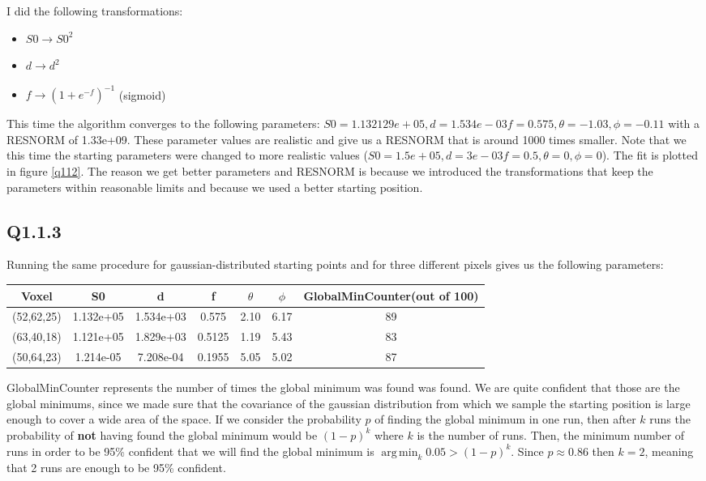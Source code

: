 \documentclass[11pt,a4paper,oneside]{report}
\DeclareMathOperator*{\argmin}{arg\,min}
\begin{document}
I did the following transformations:
\begin{itemize}
 \item $S0 \to S0^2$
 \item $d \to d^2$
 \item $f \to (1+e^{-f})^{-1}$ (sigmoid)
\end{itemize}
This time the algorithm converges to the following parameters: $S0 = 1.132129e+05, d=1.534e-03 f=0.575, \theta=-1.03,  \phi=-0.11$ with a RESNORM of 1.33e+09. These parameter values are realistic and give us a RESNORM that is around 1000 times smaller. Note that we this time the starting parameters were changed to more realistic values ($S0 = 1.5e+05, d=3e-03 f=0.5, \theta=0,  \phi=0$). The fit is plotted in figure \ref{q112}. The reason we get better parameters and RESNORM is because we introduced the transformations that keep the parameters within reasonable limits and because we used a better starting position.

\subsection*{Q1.1.3}
Running the same procedure for gaussian-distributed starting points and for three different pixels gives us the following parameters:
\begin{center}
\begin{tabular}{c | c | c | c | c | c | c}
Voxel & S0 & d & f & $\theta$ & $\phi$ & GlobalMinCounter(out of 100)\\
\hline
(52,62,25) & 1.132e+05 & 1.534e+03 & 0.575 & 2.10 & 6.17 & 89\\
(63,40,18) & 1.121e+05 & 1.829e+03 & 0.5125 & 1.19 & 5.43 & 83\\
(50,64,23) & 1.214e-05 & 7.208e-04 & 0.1955 & 5.05 & 5.02 & 87\\
\end{tabular}
\end{center}

GlobalMinCounter represents the number of times the global minimum was found was found. We are quite confident that those are the global minimums, since we made sure that the covariance of the gaussian distribution from which we sample the starting position is large enough to cover a wide area of the space. If we consider the probability $p$ of finding the global minimum in one run, then after $k$ runs the probability of \textbf{not} having found the global minimum would be $(1-p)^k$ where $k$ is the number of runs. Then, the minimum number of runs in order to be 95\% confident that we will find the global minimum is $\argmin_{k} 0.05 > (1-p)^k$. Since $p \approx 0.86$ then $k = 2$, meaning that 2 runs are enough to be 95\% confident.
\end{document}
